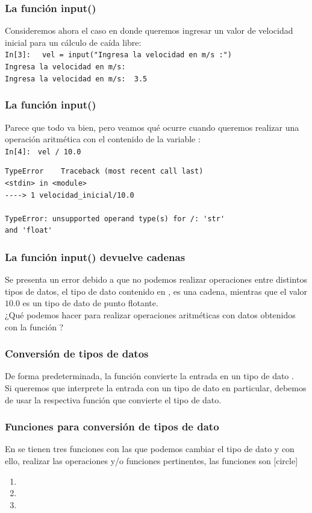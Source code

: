 \begin{frame}[fragile]
\frametitle{La función input()}
Consideremos ahora el caso en donde queremos ingresar un valor de velocidad inicial para un cálculo de caída libre:
\\
\bigskip
\textcolor{ao}{\texttt{In[3]: }} \verb| vel = input("Ingresa la velocidad en m/s :")|
\\
\pause
\verb|Ingresa la velocidad en m/s: |
\\
\pause
\verb|Ingresa la velocidad en m/s:  3.5|
\end{frame}
\begin{frame}[fragile]
\frametitle{La función input()}
Parece que todo va bien, pero veamos qué ocurre cuando queremos realizar una operación aritmética con el contenido de la variable :
\\
\pause
\textcolor{ao}{\texttt{In[4]: }} \verb|vel / 10.0|
\\
\pause
\fontsize{12}{12}\selectfont
\begin{verbatim}
TypeError    Traceback (most recent call last)
<stdin> in <module>
----> 1 velocidad_inicial/10.0

TypeError: unsupported operand type(s) for /: 'str'
and 'float'
\end{verbatim}
\end{frame}
\begin{frame}
\frametitle{La función input() devuelve cadenas}
Se presenta un error debido a que no podemos realizar operaciones entre distintos tipos de datos, el tipo de dato contenido en , es una cadena, mientras que el valor $10.0$ es un tipo de dato de punto flotante.
\\
\bigskip
\pause
¿Qué podemos hacer para realizar operaciones aritméticas con datos obtenidos con la función ?
\end{frame}
\begin{frame}
\frametitle{Conversión de tipos de datos}
De forma predeterminada, la función  convierte la entrada en un tipo de dato .
\\
\bigskip
Si queremos que \python{} interprete la entrada con un tipo de dato en particular, debemos de usar la respectiva función que convierte el tipo de dato.
\end{frame}
\begin{frame}[fragile]
\frametitle{Funciones para conversión de tipos de dato}
En \python{} se tienen tres funciones con las que podemos cambiar el tipo de dato y con ello, realizar las operaciones y/o funciones pertinentes, las funciones son
[circle]
\begin{enumerate}[<+->]
\item {}
\item {}
\item {}
\end{enumerate}
\end{frame}
